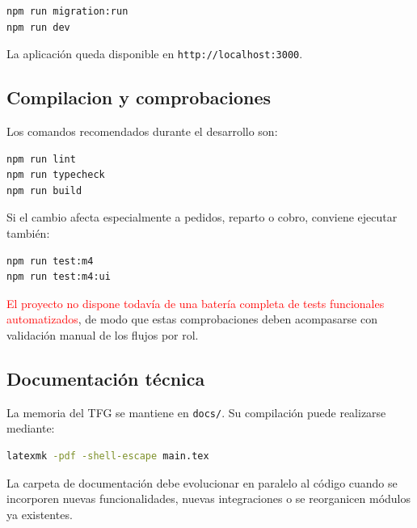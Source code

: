 \begin{lstlisting}[language=bash]
npm run migration:run
npm run dev
\end{lstlisting}

La aplicación queda disponible en \texttt{http://localhost:3000}.

\subsection{Compilacion y comprobaciones}

Los comandos recomendados durante el desarrollo son:

\begin{lstlisting}[language=bash]
npm run lint
npm run typecheck
npm run build
\end{lstlisting}

Si el cambio afecta especialmente a pedidos, reparto o cobro, conviene ejecutar también:

\begin{lstlisting}[language=bash]
npm run test:m4
npm run test:m4:ui
\end{lstlisting}

\textcolor{red}{El proyecto no dispone todavía de una batería completa de tests funcionales automatizados}, de modo que estas comprobaciones deben acompasarse con validación manual de los flujos por rol.

\subsection{Documentación técnica}

La memoria del TFG se mantiene en \texttt{docs/}. Su compilación puede realizarse mediante:

\begin{lstlisting}[language=bash]
latexmk -pdf -shell-escape main.tex
\end{lstlisting}

La carpeta de documentación debe evolucionar en paralelo al código cuando se incorporen nuevas funcionalidades, nuevas integraciones o se reorganicen módulos ya existentes.
